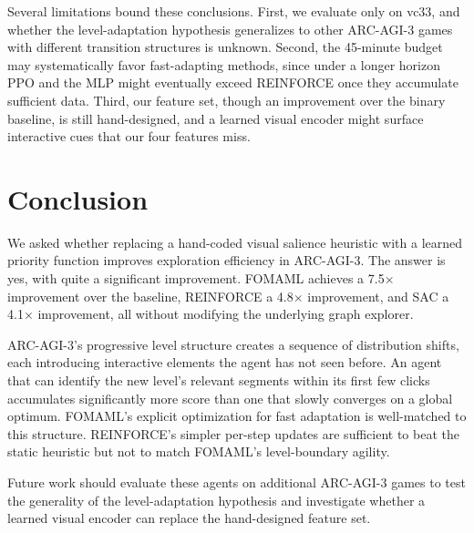 \documentclass{article}
\begin{document}
Several limitations bound these conclusions. First, we evaluate only on vc33, and whether the level-adaptation hypothesis generalizes to other ARC-AGI-3 games with different transition structures is unknown. Second, the 45-minute budget may systematically favor fast-adapting methods, since under a longer horizon PPO and the MLP might eventually exceed REINFORCE once they accumulate sufficient data. Third, our feature set, though an improvement over the binary baseline, is still hand-designed, and a learned visual encoder might surface interactive cues that our four features miss.

\section{Conclusion}
We asked whether replacing a hand-coded visual salience heuristic with a learned priority function improves exploration efficiency in ARC-AGI-3. The answer is yes, with quite a significant improvement. FOMAML achieves a 7.5$\times$ improvement over the baseline, REINFORCE a 4.8$\times$ improvement, and SAC a 4.1$\times$ improvement, all without modifying the underlying graph explorer.

ARC-AGI-3's progressive level structure creates a sequence of distribution shifts, each introducing interactive elements the agent has not seen before. An agent that can identify the new level's relevant segments within its first few clicks accumulates significantly more score than one that slowly converges on a global optimum. FOMAML's explicit optimization for fast adaptation is well-matched to this structure. REINFORCE's simpler per-step updates are sufficient to beat the static heuristic but not to match FOMAML's level-boundary agility.

Future work should evaluate these agents on additional ARC-AGI-3 games to test the generality of the level-adaptation hypothesis and investigate whether a learned visual encoder can replace the hand-designed feature set.
\end{document}
